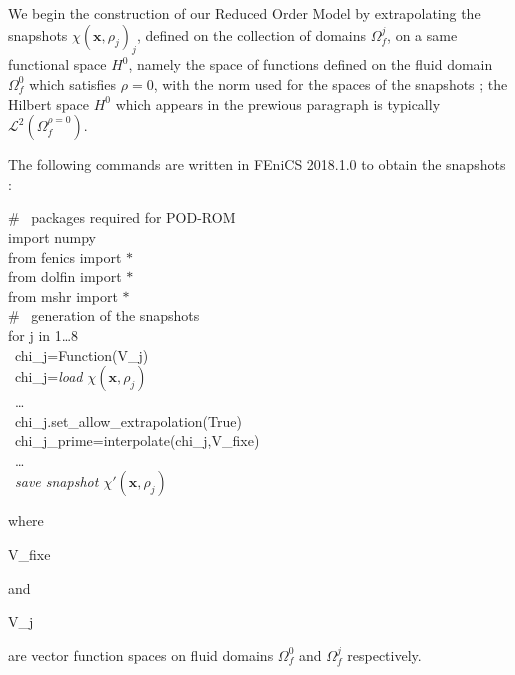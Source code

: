 \etoile
We begin the construction of our Reduced Order Model by extrapolating the snapshots $\chi(\mathbf{x},\rho_j)_j$, defined on the collection of domains $\Omega_f^j$, %
on a same functional space $H^0$, namely the space of functions defined on the fluid domain $\Omega_f^0$ which satisfies $\rho=0$, %
with the norm used for the spaces of the snapshots ; %
the Hilbert space $H^0$ which appears in the prewious paragraph is typically $\mathcal{L}^2\left(\Omega_f^{\rho=0}\right)$.

\par
The following commands are written in FEniCS 2018.1.0 to obtain the snapshots :

\begin{codef}
\# \ packages required for POD-ROM\\
import numpy\\
from fenics import $\ast$\\
from dolfin import $\ast$\\
from mshr import $\ast$\\
\# \ generation of the snapshots\\
for j in 1\dots 8\\
\ chi\_j=Function(V\_j)\\
\ chi\_j=\emph{load $\chi(\mathbf{x},\rho_j)$}\\
\ \dots \\
\ chi\_j.set\_allow\_extrapolation(True)\\
\ chi\_j\_prime=interpolate(chi\_j,V\_fixe)\\
\ \dots \\
\ \emph{save snapshot $\chi'(\mathbf{x},\rho_j)$}
\end{codef}

where \begin{code}V\_fixe\end{code} and \begin{code}V\_j\end{code} are vector function spaces on fluid domains $\Omega_f^0$ and $\Omega_f^j$ respectively.

